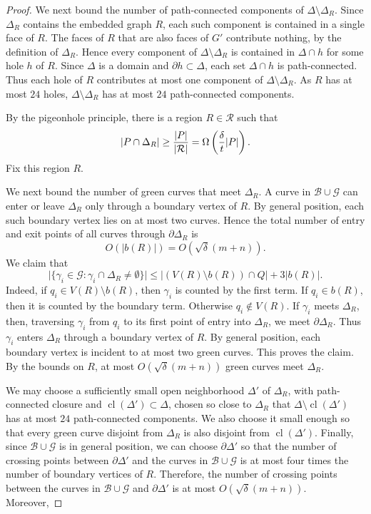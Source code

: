 \documentclass[11pt]{article}
\theoremstyle{plain}
\theoremstyle{definition}
\theoremstyle{remark}
\begin{document}
\begin{proof}
We next bound the number of path-connected components of
\(\Delta\setminus\Delta_R\). Since \(\Delta_R\) contains the embedded graph
\(R\), each such component is contained in a single face of \(R\). The faces
of \(R\) that are also faces of \(G'\) contribute nothing, by the definition of
\(\Delta_R\). Hence every component of \(\Delta\setminus\Delta_R\) is contained
in \(\Delta\cap h\) for some hole \(h\) of \(R\). Since \(\Delta\) is a domain
and \(\partial h\subset\Delta\), each set \(\Delta\cap h\) is path-connected.
Thus each hole of \(R\) contributes at most one component of
\(\Delta\setminus\Delta_R\). As \(R\) has at most \(24\) holes,
\(\Delta\setminus\Delta_R\) has at most \(24\) path-connected components.




By the pigeonhole principle, there is a region \(R\in\mathcal R\) such that
\[
|P\cap\Delta_R|
\ge { |P| \over |\mathcal R|}
=
\Omega\left({\delta\over t}|P|\right).
\]
Fix this region \(R\).

We next bound the number of green curves that meet \(\Delta_R\). A curve in
\(\mathcal B\cup\mathcal G\) can enter or leave \(\Delta_R\) only through a
boundary vertex of \(R\). By general position, each such boundary vertex lies
on at most two curves. Hence the total number of entry and exit points of all
curves through \(\partial\Delta_R\) is
\[
O(|b(R)|)=O(\sqrt\delta(m+n)).
\]
We claim that
\[
\bigl|\{\gamma_i\in\mathcal G:\gamma_i\cap\Delta_R\ne\emptyset\}\bigr|
\le |(V(R)\setminus b(R))\cap Q|+3|b(R)|.
\]
Indeed, if \(q_i\in V(R)\setminus b(R)\), then \(\gamma_i\) is counted by the
first term. If \(q_i\in b(R)\), then it is counted by the boundary term.
Otherwise \(q_i\notin V(R)\). If \(\gamma_i\) meets \(\Delta_R\), then,
traversing \(\gamma_i\) from \(q_i\) to its first point of entry into
\(\Delta_R\), we meet \(\partial\Delta_R\). Thus \(\gamma_i\) enters
\(\Delta_R\) through a boundary vertex of \(R\). By general position, each
boundary vertex is incident to at most two green curves. This proves the
claim.  By the bounds on \(R\), at most $O(\sqrt\delta(m+n))$ green curves meet \(\Delta_R\).

We may choose a sufficiently small open neighborhood \(\Delta'\) of
\(\Delta_R\), with path-connected closure and
\(\operatorname{cl}(\Delta')\subset\Delta\), chosen so close to \(\Delta_R\)
that \(\Delta\setminus\operatorname{cl}(\Delta')\) has at most \(24\)
path-connected components.  We also choose it small enough so that every green curve
disjoint from \(\Delta_R\) is also disjoint from \(\operatorname{cl}(\Delta')\).
Finally, since $\mathcal B\cup \mathcal G$ is in general position, we can choose \(\partial\Delta'\) so that the number of crossing points
between \(\partial\Delta'\) and the curves in $\mathcal B\cup \mathcal G$ is at most four times the
number of boundary vertices of \(R\). Therefore, the number of crossing points between the curves in $\mathcal B\cup\mathcal G$ and $\partial\Delta'$ is at most $O(\sqrt\delta(m+n))$.  Moreover, 


\end{proof}
\end{document}
